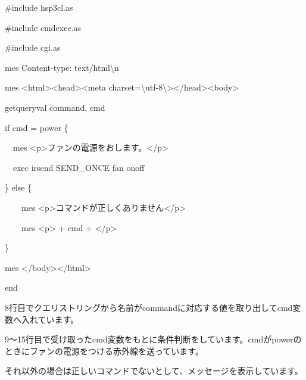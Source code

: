 \documentclass[a4paper,12pt,dvipdfmx]{jarticle}
\begin{document}
\centering
\begin{boxedminipage}{16.36cm}
	\#include {\textquotedbl}hsp3cl.as{\textquotedbl}

	\#include {\textquotedbl}cmdexec.as{\textquotedbl}

	\#include {\textquotedbl}cgi.as{\textquotedbl}


	\bigskip

	mes {\textquotedbl}Content-type: text/html{\textbackslash}n{\textquotedbl}

	mes {\textquotedbl}{\textless}html{\textgreater}{\textless}head{\textgreater}{\textless}meta
	charset={\textbackslash}{\textquotedbl}utf-8{\textbackslash}{\textquotedbl}{\textgreater}{\textless}/head{\textgreater}{\textless}body{\textgreater}{\textquotedbl}


	\bigskip

	getqueryval {\textquotedbl}command{\textquotedbl}, cmd

	if cmd = {\textquotedbl}power{\textquotedbl} \{

	\ \ mes
		{\textquotedbl}{\textless}p{\textgreater}ファンの電源をおします。{\textless}/p{\textgreater}{\textquotedbl}

	\ \ exec {\textquotedbl}irsend SEND\_ONCE fan onoff{\textquotedbl}

	\} else \{

	\ \ \ \ mes
		{\textquotedbl}{\textless}p{\textgreater}コマンドが正しくありません{\textless}/p{\textgreater}{\textquotedbl}

	\ \ \ \ mes {\textquotedbl}{\textless}p{\textgreater}{\textquotedbl} + cmd +
	{\textquotedbl}{\textless}/p{\textgreater}{\textquotedbl}

	\}


	\bigskip

	mes {\textquotedbl}{\textless}/body{\textgreater}{\textless}/html{\textgreater}{\textquotedbl}

	end
\end{boxedminipage}
\flushleft

\bigskip




\bigskip


\bigskip

8行目でクエリストリングから名前がcommandに対応する値を取り出してcmd変数へ入れています。

9〜15行目で受け取ったcmd変数をもとに条件判断をしています。cmdがpowerのときにファンの電源をつける赤外線を送っています。

それ以外の場合は正しいコマンドでないとして、メッセージを表示しています。
\end{document}
